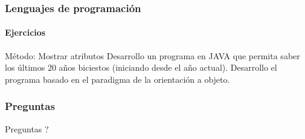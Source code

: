 \documentclass{beamer}
\begin{document}
		\begin{frame}
			\frametitle{Lenguajes de programaci\'on}
			\framesubtitle{Ejercicios}

			\begin{block}{M\'etodo: Mostrar atributos}
				Desarrollo un programa en JAVA que permita saber los \'ultimos 20 a\~nos biciestos (iniciando desde el a\~no actual). Desarrollo el programa basado en el paradigma de la orientaci\'on a objeto.
			\end{block}
			
		\end{frame}



		\begin{frame}
			\frametitle{Preguntas}

			\hspace{4cm}\huge{Preguntas ?}
		
		\end{frame}
\end{document}
